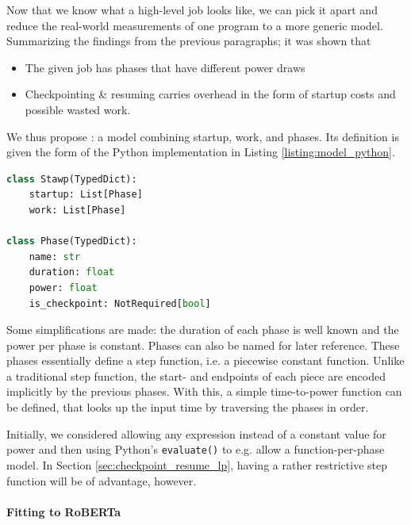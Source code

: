 Now that we know what a high-level job looks like, we can pick it apart and reduce the real-world measurements of one program to a more generic model. 
Summarizing the findings from the previous paragraphs; it was shown that 

\begin{itemize}
    \item The given job has phases that have different power draws
    \item Checkpointing \& resuming carries overhead in the form of startup costs and possible wasted work.
\end{itemize}

We thus propose \modelname{}: a model combining startup, work, and phases.
Its definition is given the form of the Python implementation in Listing \ref{listing:model_python}.

\begin{minipage}{\linewidth}
\begin{lstlisting}[language=python, frame=single, numbers=none, caption={Definition of \modelname{} as a Python class}, basicstyle=\ttfamily, label={listing:model_python}]
class Stawp(TypedDict):
    startup: List[Phase]
    work: List[Phase]
    
class Phase(TypedDict):
    name: str
    duration: float
    power: float
    is_checkpoint: NotRequired[bool]   
\end{lstlisting}
\end{minipage}

Some simplifications are made: the duration of each phase is well known and the power per phase is constant. 
Phases can also be named for later reference.
These phases essentially define a step function, i.e. a piecewise constant function.
Unlike a traditional step function, the start- and endpoints of each piece are encoded implicitly by the previous phases.
With this, a simple time-to-power function can be defined, that looks up the input time by traversing the phases in order.

Initially, we considered allowing any expression instead of a constant value for power and then using Python's \verb|evaluate()| to e.g. allow a function-per-phase model.
In Section \ref{sec:checkpoint_resume_lp}, having a rather restrictive step function will be of advantage, however.

\paragraph{Fitting \modelname to RoBERTa}

